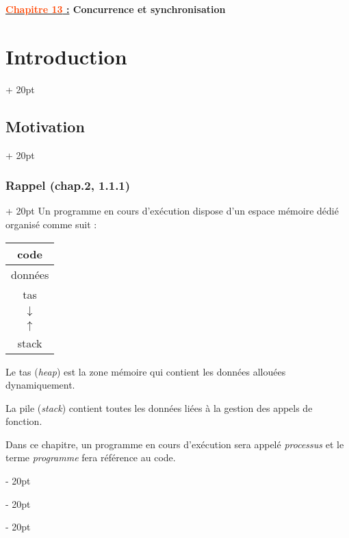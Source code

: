 \documentclass[a4paper, 12pt, twoside]{article}
\renewcommand{\emph}{\textcolor{ff4500}}
\newcommand{\ind}[1][20pt]{\advance\leftskip + #1}
\newcommand{\deind}[1][20pt]{\advance\leftskip - #1}
\newenvironment{indt}[2][20pt]{#2 \par \ind[#1]}{\par \deind} %
\newcommand{\thetitle}[2]{\begin{center}\textbf{{\LARGE \underline{\emph{#1} :}} {\Large #2}}\end{center}}
\begin{document}
    
    
    \thetitle{Chapitre 13}{Concurrence et synchronisation}
    
    \tableofcontents
    \newpage
    
    
    \begin{indt}{\section{Introduction}}
        \begin{indt}{\subsection{Motivation}}
            \begin{indt}{\subsubsection{Rappel (chap.2, 1.1.1)}}
                Un programme en cours d'exécution dispose d'un espace mémoire dédié organisé comme suit :

                \begin{center}
                    \begin{tabular}{|c|}
                        \hline
                        code
                        \\
                        \hline
                        données
                        \\
                        \hline
                        tas
                        \\
                        $\downarrow$
                        \\
                        \hline
                        $\uparrow$
                        \\
                        stack
                        \\
                        \hline
                    \end{tabular}
                \end{center}

                Le tas (\textit{heap}) est la zone mémoire qui contient les données allouées dynamiquement.

                La pile (\textit{stack}) contient toutes les données liées à la gestion des appels de fonction.

                Dans ce chapitre, un programme en cours d'exécution sera appelé \textit{processus} et le terme \textit{programme} fera référence au code.
            \end{indt}


\end{indt}
\end{indt}
\end{document}
